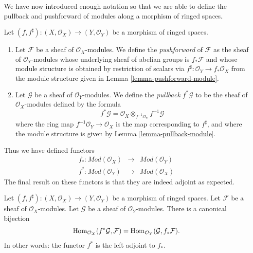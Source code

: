 \noindent
We have now introduced enough notation so that we are able to
define the pullback and pushforward of modules along a morphism
of ringed spaces.

\begin{definition}
\label{definition-pushforward}
Let $(f, f^\sharp) : (X, \mathcal{O}_X) \to (Y, \mathcal{O}_Y)$
be a morphism of ringed spaces.
\begin{enumerate}
\item Let $\mathcal{F}$ be a sheaf of $\mathcal{O}_X$-modules.
We define the {\it pushforward} of $\mathcal{F}$ as the
sheaf of $\mathcal{O}_Y$-modules whose underlying sheaf
of abelian groups is $f_*\mathcal{F}$ and whose
module structure is obtained by restriction of scalars
via $f^\sharp : \mathcal{O}_Y \to f_*\mathcal{O}_X$
from the module structure given
in Lemma \ref{lemma-pushforward-module}.
\item Let $\mathcal{G}$ be a sheaf of $\mathcal{O}_Y$-modules.
We define the {\it pullback} $f^*\mathcal{G}$ to be the
sheaf of $\mathcal{O}_X$-modules defined by the formula
$$
f^*\mathcal{G}
=
\mathcal{O}_X \otimes_{f^{-1}\mathcal{O}_Y} f^{-1}\mathcal{G}
$$
where the ring map $f^{-1}\mathcal{O}_Y \to \mathcal{O}_X$
is the map corresponding to $f^\sharp$, and where the  module
structure is given by Lemma \ref{lemma-pullback-module}.
\end{enumerate}
\end{definition}

\noindent
Thus we have defined functors
\begin{eqnarray*}
f_* : \textit{Mod}(\mathcal{O}_X)
& \longrightarrow &
\textit{Mod}(\mathcal{O}_Y) \\
f^* : \textit{Mod}(\mathcal{O}_Y)
& \longrightarrow &
\textit{Mod}(\mathcal{O}_X)
\end{eqnarray*}
The final result on these functors is that they are indeed
adjoint as expected.

\begin{lemma}
\label{lemma-adjoint-pullback-pushforward-modules}
Let $(f, f^\sharp) : (X, \mathcal{O}_X) \to (Y, \mathcal{O}_Y)$
be a morphism of ringed spaces.
Let $\mathcal{F}$ be a sheaf of $\mathcal{O}_X$-modules.
Let $\mathcal{G}$ be a sheaf of $\mathcal{O}_Y$-modules.
There is a canonical bijection
$$
\mathop{\mathrm{Hom}}\nolimits_{\mathcal{O}_X}(f^*\mathcal{G}, \mathcal{F})
=
\mathop{\mathrm{Hom}}\nolimits_{\mathcal{O}_Y}(\mathcal{G}, f_*\mathcal{F}).
$$
In other words: the functor $f^*$ is the left adjoint to
$f_*$.
\end{lemma}

